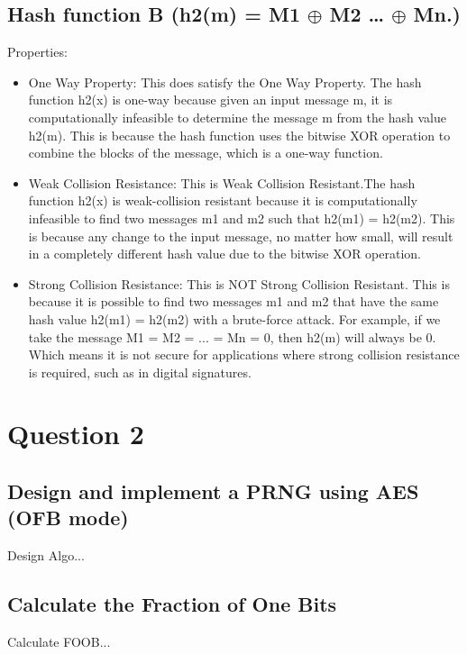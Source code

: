 \documentclass[10pt]{article}
\begin{document}
\subsection{Hash function B (h2(m) = M1 $\oplus$ M2 … $\oplus$ Mn.)}
\noindent Properties:
\begin{itemize}
	\item One Way Property: This does satisfy the One Way Property. The hash function h2(x) is one-way because given an input message m, it is computationally infeasible to determine the message m from the hash value h2(m). This is because the hash function uses the bitwise XOR operation to combine the blocks of the message, which is a one-way function.
	
	
	\item Weak Collision Resistance: This is Weak Collision Resistant.The hash function h2(x) is weak-collision resistant because it is computationally infeasible to find two messages m1 and m2 such that h2(m1) = h2(m2). This is because any change to the input message, no matter how small, will result in a completely different hash value due to the bitwise XOR operation.
	
	
	\item Strong Collision Resistance: This is NOT Strong Collision Resistant. This is because it is possible to find two messages m1 and m2 that have the same hash value h2(m1) = h2(m2) with a brute-force attack. For example, if we take the message M1 = M2 = ... = Mn = 0, then h2(m) will always be 0. Which means it is not secure for applications where strong collision resistance is required, such as in digital signatures.
\end{itemize}







\vspace{0.2in}
\section{Question 2}
\subsection{Design and implement a PRNG using AES (OFB mode)}
\noindent Design Algo...


\subsection{Calculate the Fraction of One Bits} 
\noindent Calculate FOOB...

\vspace{0.2in}
\end{document}
